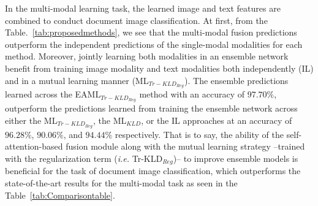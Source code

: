 \documentclass[twocolumn]{svjour3}
\newcommand{\ie}{\textit{i.e. }}
\begin{document}
In the multi-modal learning task, the learned image and text features are combined to conduct document image classification. At first, from the Table.~\ref{tab:proposedmethods}, we see that the multi-modal fusion predictions outperform the independent predictions of the single-modal modalities for each method. 
Moreover, jointly learning both modalities in an ensemble network benefit from training image modality and text modalities both independently (IL) and in a mutual learning manner (ML$_{{Tr-KLD}_{Reg}}$). The ensemble predictions learned across the EAML$_{{Tr-KLD}_{Reg}}$ method with an accuracy of $97.70\%$, outperform the predictions learned from training the ensemble network across either the ML$_{{Tr-KLD}_{Reg}}$, the ML$_{KLD}$, or the IL approaches at an accuracy of $96.28\%$, $90.06\%$, and $94.44\%$ respectively. That is to say, the ability of the self-attention-based fusion module along with the mutual learning strategy --trained with the regularization term (\ie Tr-KLD$_{Reg}$)-- to improve ensemble models is beneficial for the task of document image classification, which outperforms the state-of-the-art results for the multi-modal task as seen in the Table~\ref{tab:Comparisontable}. 
\setlength\tabcolsep{7 pt}
\end{document}
